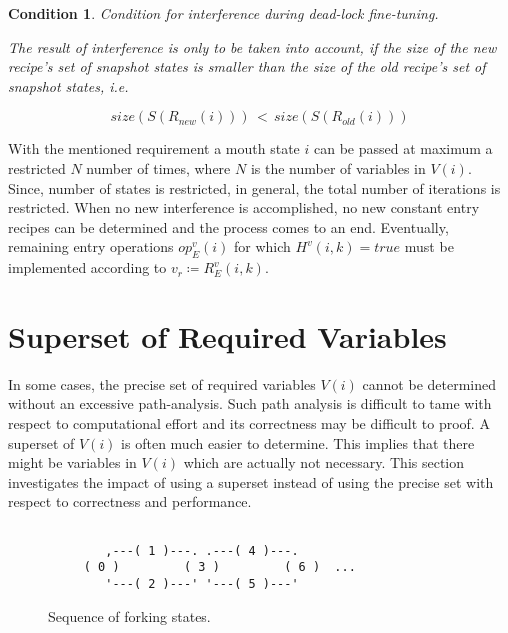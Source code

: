 \documentclass[12pt,a4paper]{scrartcl}
\newtheorem{condition}{Condition}
\begin{document}
\begin{condition}
Condition for interference during dead-lock fine-tuning.

The result of interference is only to be taken into account, if the size of the
new recipe's set of snapshot states is smaller than the size of the old
recipe's set of snapshot states, i.e.

\begin{equation} 
    size(S(R_{new}(i)))\,<\,size(S(R_{old}(i)))
\end{equation}

\end{condition}

With the mentioned requirement a mouth state $i$ can be passed at maximum a
restricted $N$ number of times, where $N$ is the number of variables in $V(i)$.
Since, number of states is restricted, in general, the total number of
iterations is restricted. When no new interference is accomplished, no new
constant entry recipes can be determined and the process comes to an end.
Eventually, remaining entry operations $op_E^v(i)$ for which $H^v(i,k)=true$
must be implemented according to $v_r \coloneqq  R_E^v(i,k)$.

\section{Superset of Required Variables}

In some cases, the precise set of required variables $V(i)$ cannot be
determined without an excessive path-analysis. Such path analysis is difficult
to tame with respect to computational effort and its correctness may be
difficult to proof.  A superset of $V(i)$ is often much easier to determine.
This implies that there might be variables in $V(i)$ which are actually not
necessary. This section investigates the impact of using a superset instead
of using the precise set with respect to correctness and performance. 

\begin{figure}[htbp] \leavevmode \label{fig:fork-states}
\begin{verbatim}
         
        ,---( 1 )---. .---( 4 )---.       
     ( 0 )         ( 3 )         ( 6 )  ...
        '---( 2 )---' '---( 5 )---'

\end{verbatim}
\caption{Sequence of forking states.}
\end{figure}
\end{document}
